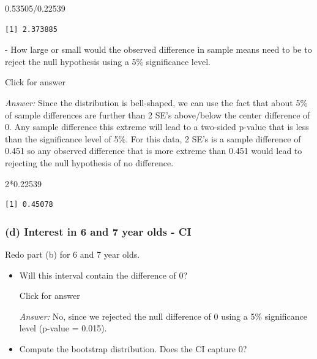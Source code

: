 \documentclass[
]{book}
\newenvironment{Shaded}{\begin{snugshade}}{\end{snugshade}}
\newcommand{\DecValTok}[1]{\textcolor[rgb]{0.00,0.00,0.81}{#1}}
\newcommand{\FloatTok}[1]{\textcolor[rgb]{0.00,0.00,0.81}{#1}}
\newcommand{\SpecialCharTok}[1]{\textcolor[rgb]{0.00,0.00,0.00}{#1}}
\begin{document}
\begin{Shaded}
\begin{Highlighting}[]
\FloatTok{0.53505}\SpecialCharTok{/}\FloatTok{0.22539} 
\end{Highlighting}
\end{Shaded}

\begin{verbatim}
[1] 2.373885
\end{verbatim}

- How large or small would the observed difference in sample means need to be to reject the null hypothesis using a 5\% significance level.

Click for answer

\emph{Answer:} Since the distribution is bell-shaped, we can use the fact that about 5\% of sample differences are further than 2 SE's above/below the center difference of 0. Any sample difference this extreme will lead to a two-sided p-value that is less than the significance level of 5\%. For this data, 2 SE's is a sample difference of 0.451 so any observed difference that is more extreme than 0.451 would lead to rejecting the null hypothesis of no difference.

\begin{Shaded}
\begin{Highlighting}[]
\DecValTok{2}\SpecialCharTok{*}\FloatTok{0.22539} 
\end{Highlighting}
\end{Shaded}

\begin{verbatim}
[1] 0.45078
\end{verbatim}

\vspace*{.5in}

\hypertarget{d-interest-in-6-and-7-year-olds---ci}{%
\subsubsection{(d) Interest in 6 and 7 year olds - CI}\label{d-interest-in-6-and-7-year-olds---ci}}

Redo part (b) for 6 and 7 year olds.

\begin{itemize}
\item
  Will this interval contain the difference of 0?

  Click for answer

  \emph{Answer:} No, since we rejected the null difference of 0 using a 5\% significance level (p-value = 0.015).

  \vspace*{.5in}
\item
  Compute the bootstrap distribution. Does the CI capture 0?
\end{itemize}
\end{document}
